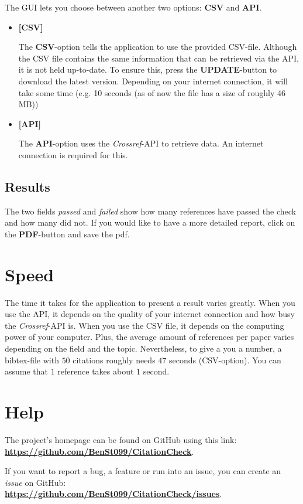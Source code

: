 \documentclass[11pt]{article}
\begin{document}
        The GUI lets you choose between another two options: \textbf{CSV} and \textbf{API}.

        \begin{itemize}
            \item \textbf{[CSV]}
            
            The \textbf{CSV}-option tells the application to use the provided CSV-file. Although the CSV file contains the same information that can be retrieved via the API,
            it is not held up-to-date. To ensure this, press the \textbf{UPDATE}-button to download the latest version. Depending on your internet connection, it will take some time (e.g. 10 seconds (as of now the file has a size of roughly 46 MB))
            
            \item \textbf{[API]}
            
            The \textbf{API}-option uses the \textit{Crossref}-API to retrieve data. An internet connection is required for this.
        \end{itemize}

        \subsection{Results}

        The two fields \textit{passed} and \textit{failed} show how many references have passed the check and how many did not. If you would like to have a more detailed report, 
        click on the \textbf{PDF}-button and save the pdf. 

    \section{Speed}
    
    The time it takes for the application to present a result varies greatly. When you use the API, it depends on the quality of your internet connection and how busy the \textit{Crossref}-API is.
    When you use the CSV file, it depends on the computing power of your computer.
    Plus, the average amount of references per paper varies depending on the field and the topic. Nevertheless, to give a you a number, a bibtex-file with $50$ citations roughly needs $47$ seconds (CSV-option).
    You can assume that $1$ reference takes about $1$ second.

    \section{Help}\label{sec:help}

    The project's homepage can be found on GitHub using this link: \\ \textbf{\url{https://github.com/BenSt099/CitationCheck}}. \vspace{5mm} 
    
    \noindent If you want to report a bug, a feature or run into an issue, you can create an \textit{issue} on GitHub: \\ \textbf{\url{https://github.com/BenSt099/CitationCheck/issues}}.
\end{document}
